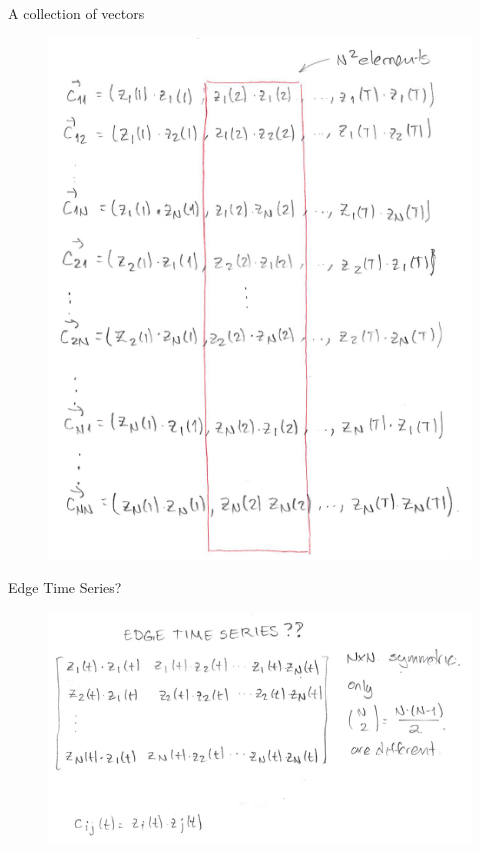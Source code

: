 \documentclass{beamer}
\begin{document}
\begin{frame}{A collection of vectors}
		\begin{figure}[h]
		\centering
			\includegraphics[scale=0.3]{../Figures/fig_novelli_description3.png}
	\end{figure}
	
\end{frame}

\begin{frame}{Edge Time Series?	}
	\begin{figure}[h]
		\centering
			\includegraphics[scale=0.6]{../Figures/fig_novelli_description4.png}
	\end{figure}
\end{frame}
\end{document}
